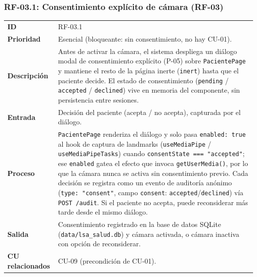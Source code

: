 \subsubsection{RF-03.1: Consentimiento explícito de cámara (RF-03)}
\begin{table}[H]
\centering
\begin{tabularx}{\textwidth}{l X}
\toprule
\textbf{ID} & RF-03.1 \\
\textbf{Prioridad} & Esencial (bloqueante: sin consentimiento, no hay CU-01). \\
\textbf{Descripción} & Antes de activar la cámara, el sistema despliega un diálogo modal de consentimiento explícito (P-05) sobre \texttt{PacientePage} y mantiene el resto de la página inerte (\texttt{inert}) hasta que el paciente decide. El estado de consentimiento (\texttt{pending} / \texttt{accepted} / \texttt{declined}) vive en memoria del componente, sin persistencia entre sesiones. \\
\textbf{Entrada} & Decisión del paciente (acepta / no acepta), capturada por el diálogo. \\
\textbf{Proceso} & \texttt{PacientePage} renderiza el diálogo y solo pasa \texttt{enabled: true} al hook de captura de landmarks (\texttt{useMediaPipe} / \texttt{useMediaPipeTasks}) cuando \texttt{consentState === "accepted"}; ese \texttt{enabled} gatea el efecto que invoca \texttt{getUserMedia()}, por lo que la cámara nunca se activa sin consentimiento previo. Cada decisión se registra como un evento de auditoría anónimo (\texttt{type: "consent"}, campo \texttt{consent}: \texttt{accepted}/\texttt{declined}) vía \texttt{POST /audit}. Si el paciente no acepta, puede reconsiderar más tarde desde el mismo diálogo. \\
\textbf{Salida} & Consentimiento registrado en la base de datos SQLite (\texttt{data/lsa\_salud.db}) y cámara activada, o cámara inactiva con opción de reconsiderar. \\
\textbf{CU relacionados} & CU-09 (precondición de CU-01). \\
\bottomrule
\end{tabularx}
\end{table}

